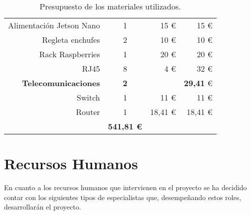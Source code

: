 \begin{table}[H]
\begin{center}
\begin{tabular}{|r|c|r|r|}
            Alimentación Jetson Nano & 1 & 15 \euro & 15 \euro\\
            Regleta enchufes & 2 & 10 \euro & 10 \euro\\
            Rack Raspberries & 1 & 20 \euro & 20 \euro\\
            RJ45 & 8 & 4 \euro & 32 \euro\\
            \hline
            \rowcolor{GrisTabla}
            \textbf{Telecomunicaciones} &  \textbf{2} & & \textbf{29,41} \euro\\
            Switch & 1 & 11 \euro & 11 \euro\\
            Router & 1 & 18,41 \euro & 18,41 \euro\\
            \hline
            \rowcolor{Naranja} 
            \multicolumn{3}{|r}{\textbf{Total}} & \textbf{541,81 \euro}\\
            \hline
        \end{tabular}
        \caption{\centering Presupuesto de los materiales utilizados.}
        \label{tab:PresupuestoMateriales}
    \end{center}    
\end{table}


\newpage
\section{Recursos Humanos}
En cuanto a los recursos humanos que intervienen en el proyecto se ha decidido contar con los siguientes tipos de especialistas que, desempeñando estos roles, desarrollarán el proyecto.

